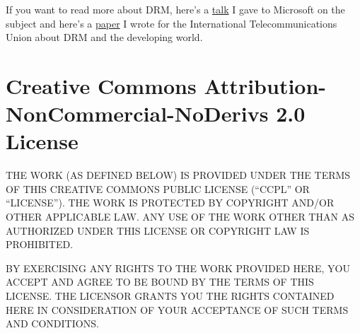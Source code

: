 If you want to read more about DRM, here's a
\href{http://craphound.com/msftdrm.txt}{talk} I gave to Microsoft
on the subject and here's a 
\href{http://www.eff.org/IP/DRM/itu\_drm.php}{paper} I wrote for the
International Telecommunications Union about DRM and the developing
world.



\section{Creative Commons Attribution-NonCommercial-NoDerivs 2.0
License}

THE WORK (AS DEFINED BELOW) IS PROVIDED UNDER THE TERMS OF THIS
CREATIVE COMMONS PUBLIC LICENSE (``CCPL'' OR ``LICENSE'').  THE WORK
IS PROTECTED BY COPYRIGHT AND/OR OTHER APPLICABLE LAW.  ANY USE OF THE
WORK OTHER THAN AS AUTHORIZED UNDER THIS LICENSE OR COPYRIGHT LAW IS
PROHIBITED.

BY EXERCISING ANY RIGHTS TO THE WORK PROVIDED HERE, YOU ACCEPT AND
AGREE TO BE BOUND BY THE TERMS OF THIS LICENSE.  THE LICENSOR GRANTS
YOU THE RIGHTS CONTAINED HERE IN CONSIDERATION OF YOUR ACCEPTANCE OF
SUCH TERMS AND CONDITIONS.

